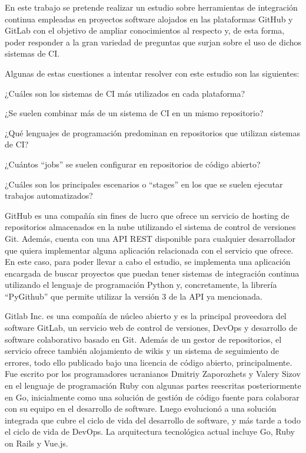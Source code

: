 En este trabajo se pretende realizar un estudio sobre herramientas de integración continua empleadas en proyectos software alojados en las plataformas GitHub y GitLab con el objetivo de ampliar conocimientos al respecto y, de esta forma, poder responder a la gran variedad de preguntas que surjan sobre el uso de dichos sistemas de CI.

Algunas de estas cuestiones a intentar resolver con este estudio son las siguientes:
\begin{compactitem}
    \item ¿Cuáles son los sistemas de CI más utilizados en cada plataforma?
    \item ¿Se suelen combinar más de un sistema de CI en un mismo repositorio?
    \item ¿Qué lenguajes de programación predominan en repositorios que utilizan sistemas de CI?
    \item ¿Cuántos ``jobs'' se suelen configurar en repositorios de código abierto?
    \item ¿Cuáles son los principales escenarios o ``stages'' en los que se suelen ejecutar trabajos automatizados?
\end{compactitem}

GitHub es una compañía sin fines de lucro que ofrece un servicio de hosting de repositorios almacenados en la nube utilizando el sistema de control de versiones Git. 
Además, cuenta con una API REST disponible para cualquier desarrollador que quiera implementar alguna aplicación relacionada con el servicio que ofrece. 
En este caso, para poder llevar a cabo el estudio, se implementa una aplicación encargada de buscar proyectos que puedan tener sistemas de integración continua utilizando el lenguaje de programación Python y, concretamente, la librería “PyGithub” que permite utilizar la versión 3 de la API ya mencionada.

Gitlab Inc. es una compañía de núcleo abierto y es la principal proveedora del software GitLab, un servicio web de control de versiones, DevOps y desarrollo de software colaborativo basado en Git. Además de un gestor de repositorios, el servicio ofrece también alojamiento de wikis y un sistema de seguimiento de errores, todo ello publicado bajo una licencia de código abierto, principalmente.
Fue escrito por los programadores ucranianos Dmitriy Zaporozhets y Valery Sizov en el lenguaje de programación Ruby con algunas partes reescritas posteriormente en Go, inicialmente como una solución de gestión de código fuente para colaborar con su equipo en el desarrollo de software. Luego evolucionó a una solución integrada que cubre el ciclo de vida del desarrollo de software, y más tarde a todo el ciclo de vida de DevOps. 
La arquitectura tecnológica actual incluye Go, Ruby on Rails y Vue.js.


